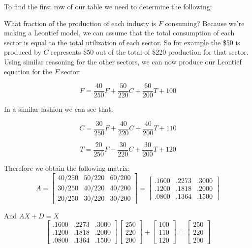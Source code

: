 \begin{solution}
    To find the first row of our table we need to determine the following:

    What fraction of the production of each industy is \( F \) consuming? Because we're making a Leontief model, we can assume that the total consumption of each sector is equal to the total utilization of each sector. So for example the \$50 is produced by \( C \) represents \$50 out of the total of \$220 production for that sector. Using similar reasoning for the other sectors, we can now produce our Leontief equation for the \( F\) sector:

    \[
        F = \frac{40}{250}F + \frac{50}{220}C + \frac{60}{200}T + 100
    \]

    In a similar fashion we can see that:

    \[
        C = \frac{30}{250}F + \frac{40}{220}C + \frac{40}{200}T + 110
    \]

    \[
        T = \frac{20}{250}F + \frac{30}{220}C + \frac{30}{200}T + 120
    \]

    Therefore we obtain the following matrix:
    \[ A = \begin{bmatrix}
            40/250 & 50/220 & 60/200 \\
            30/250 & 40/220 & 40/200 \\
            20/250 & 30/220 & 30/200
        \end{bmatrix} = \begin{bmatrix}
            .1600 & .2273 & .3000 \\
            .1200 & .1818 & .2000 \\
            .0800 & .1364 & .1500
        \end{bmatrix} \]

    And \( AX + D = X \)
    \[ \begin{bmatrix}
            .1600 & .2273 & .3000 \\
            .1200 & .1818 & .2000 \\
            .0800 & .1364 & .1500
        \end{bmatrix} \begin{bmatrix}
            250 \\
            220 \\
            200
        \end{bmatrix} + \begin{bmatrix}
            100 \\
            110 \\
            120
        \end{bmatrix} = \begin{bmatrix}
            250 \\
            220 \\
            200
        \end{bmatrix} \]
\end{solution}



